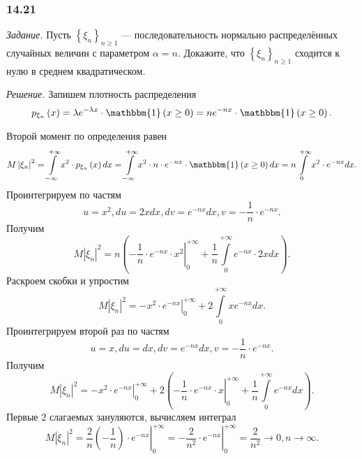 \subsubsection*{14.21}

\textit{Задание.} Пусть $ \left\{ \xi_n \right\}_{n \geq 1}$ --- последовательность нормально распределённых случайных величин с параметром $ \alpha = n$.
Докажите, что $ \left\{ \xi_n \right\}_{n \geq 1}$ сходится к нулю в среднем квадратическом.

\textit{Решение.}
Запишем плотность распределения
$$p_{ \xi_n } \left( x \right) =
\lambda e^{- \lambda x} \cdot \mathbbm{1} \left( x \geq 0 \right) =
ne^{-nx} \cdot \mathbbm{1} \left( x \geq 0 \right).$$

Второй момент по определения равен
$$M \left| \xi_n \right|^2 =
\int \limits_{- \infty }^{+ \infty } x^2 \cdot p_{ \xi_n} \left( x \right) dx =
\int \limits_{- \infty }^{+ \infty } x^2 \cdot n \cdot e^{-nx} \cdot \mathbbm{1} \left( x \geq 0 \right) dx =
n \int \limits_0^{+ \infty } x^2 \cdot e^{-nx} dx.$$
Проинтегрируем по частям 
$$u = x^2,
du = 2xdx,
dv = e^{-nx}dx,
v = - \frac{1}{n} \cdot e^{-nx}.$$
Получим
$$M \left| \xi_n \right|^2 =
n \left( \left. - \frac{1}{n} \cdot e^{-nx} \cdot x^2 \right|_0^{+ \infty } + \frac{1}{n} \int \limits_0^{+ \infty } e^{-nx} \cdot 2xdx \right).$$
Раскроем скобки и упростим
$$M \left| \xi_n \right|^2 =
\left. -x^2 \cdot e^{-nx} \right|_0^{+ \infty } + 2 \int \limits_0^{+ \infty } xe^{-nx} dx.$$
Проинтегрируем второй раз по частям
$$u = x,
du = dx,
dv = e^{-nx}dx,
v = - \frac{1}{n} \cdot e^{-nx}.$$
Получим
$$M \left| \xi_n \right|^2 =
\left. -x^2 \cdot e^{-nx} \right|_0^{+ \infty } +
2 \left( \left. - \frac{1}{n} \cdot e^{-nx} \cdot x \right|_0^{+ \infty } + \frac{1}{n} \int \limits_0^{+ \infty } e^{-nx} dx \right).$$
Первые 2 слагаемых зануляются, вычисляем интеграл
$$M \left| \xi_n \right|^2 =
\left. \frac{2}{n} \left( - \frac{1}{n} \right) \cdot e^{-nx} \right|_0^{+ \infty } =
\left. - \frac{2}{n^2} \cdot e^{-nx} \right|_0^{+ \infty } =
\frac{2}{n^2} \rightarrow 0, n \rightarrow \infty.$$
